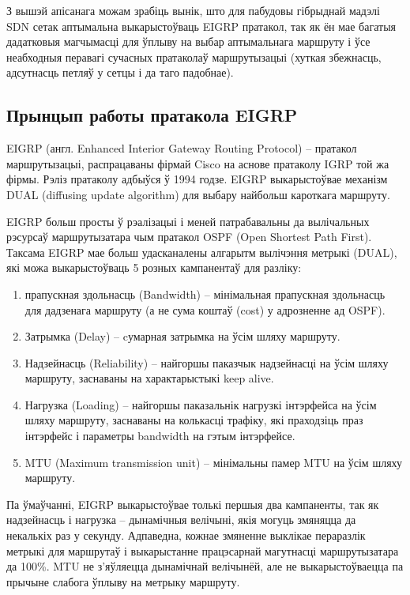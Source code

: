 З вышэй апісанага можам зрабіць вынік, што для пабудовы гібрыднай мадэлі
SDN сетак аптымальна выкарыстоўваць EIGRP пратакол, так як ён мае багатыя
дадатковыя магчымасці для ўплыву на выбар аптымальнага маршруту і ўсе
неабходныя перавагі сучасных пратаколаў маршрутызацыі (хуткая збежнасць, адсутнасць петляў у сетцы і да таго падобнае).

\subsection{Прынцып работы пратакола EIGRP}

EIGRP (англ. Enhanced Interior Gateway Routing Protocol) -- пратакол маршрутызацыі, распрацаваны фірмай Cisco на аснове пратаколу IGRP той жа фірмы. Рэліз пратаколу адбыўся ў 1994 годзе. EIGRP выкарыстоўвае механізм DUAL (diffusing update algorithm) для выбару найбольш кароткага маршруту.

EIGRP больш просты ў рэалізацыі і меней патрабавальны да вылічальных рэсурсаў маршрутызатара чым пратакол OSPF (Open Shortest Path First). Таксама EIGRP мае больш удасканалены алгарытм вылічэння метрыкі (DUAL), які можа выкарыстоўваць 5 розных кампанентаў для разліку:

\begin{enumerate}
    \item прапускная здольнасць (Bandwidth) -- мінімальная прапускная здольнасць для дадзенага маршруту (а не сума коштаў (cost) у адрозненне ад OSPF).
    \item Затрымка (Delay) -- cумарная затрымка на ўсім шляху маршруту.
    \item Надзейнасць (Reliability) -- найгоршы паказчык надзейнасці на ўсім шляху маршруту, заснаваны на характарыстыкі keep alive.
    \item Нагрузка (Loading) -- найгоршы паказальнік нагрузкі інтэрфейса на ўсім шляху маршруту, заснаваны на колькасці трафіку, які праходзіць праз інтэрфейс і параметры bandwidth на гэтым інтэрфейсе.
    \item MTU (Maximum transmission unit) -- мінімальны памер MTU на ўсім шляху маршруту.
\end{enumerate}

Па ўмаўчанні, EIGRP выкарыстоўвае толькі першыя два кампаненты, так як надзейнасць і нагрузка -- дынамічныя велічыні, якія могуць змяняцца да некалькіх раз у секунду. Адпаведна, кожнае змяненне выклікае пераразлік метрыкі для маршрутаў і выкарыстанне працэсарнай магутнасці маршрутызатара да 100\%. MTU не з'яўляецца дынамічнай велічынёй, але не выкарыстоўваецца па прычыне слабога ўплыву на метрыку маршруту.

